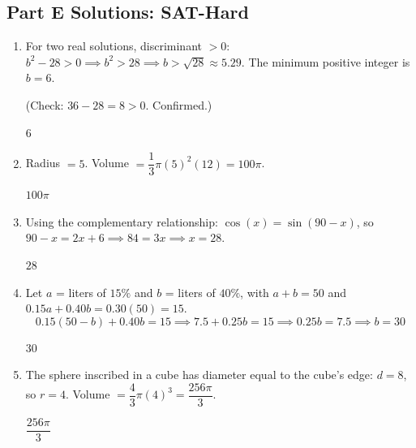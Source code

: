 \documentclass[14pt]{extarticle}
\begin{document}
\subsection*{Part E Solutions: SAT-Hard}
\begin{enumerate}
  \item For two real solutions, discriminant \(> 0\): \(b^2 - 28 > 0 \implies b^2 > 28 \implies b > \sqrt{28} \approx 5.29\). The minimum positive integer is \(b = 6\).

  (Check: \(36 - 28 = 8 > 0\). Confirmed.)

  \(\boxed{6}\)

  \item Radius \(= 5\). Volume \(= \dfrac{1}{3}\pi(5)^2(12) = 100\pi\).

  \(\boxed{100\pi}\)

  \item Using the complementary relationship: \(\cos(x) = \sin(90 - x)\), so \(90 - x = 2x + 6 \implies 84 = 3x \implies x = 28\).

  \(\boxed{28}\)

  \item Let \(a\) = liters of \(15\%\) and \(b\) = liters of \(40\%\), with \(a + b = 50\) and \(0.15a + 0.40b = 0.30(50) = 15\).
  \[
  0.15(50 - b) + 0.40b = 15 \implies 7.5 + 0.25b = 15 \implies 0.25b = 7.5 \implies b = 30
  \]

  \(\boxed{30}\)

  \item The sphere inscribed in a cube has diameter equal to the cube's edge: \(d = 8\), so \(r = 4\). Volume \(= \dfrac{4}{3}\pi(4)^3 = \dfrac{256\pi}{3}\).

  \(\boxed{\dfrac{256\pi}{3}}\)
\end{enumerate}

\end{document}
